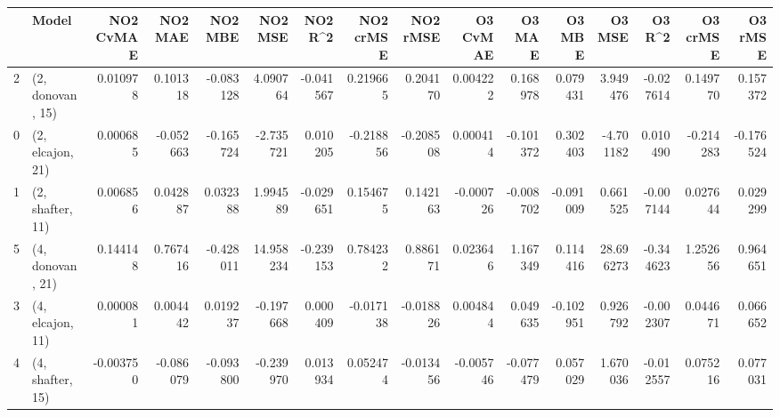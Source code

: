 \begin{tabular}{llrrrrrrrrrrrrrr}
\toprule
{} &             Model &  NO2 CvMAE &   NO2 MAE &   NO2 MBE &    NO2 MSE &   NO2 R\textasciicircum2 &  NO2 crMSE &  NO2 rMSE &  O3 CvMAE &    O3 MAE &    O3 MBE &     O3 MSE &    O3 R\textasciicircum2 &  O3 crMSE &   O3 rMSE \\
\midrule
2 &  (2, donovan, 15) &   0.010978 &  0.101318 & -0.083128 &   4.090764 & -0.041567 &   0.219665 &  0.204170 &  0.004222 &  0.168978 &  0.079431 &   3.949476 & -0.027614 &  0.149770 &  0.157372 \\
0 &  (2, elcajon, 21) &   0.000685 & -0.052663 & -0.165724 &  -2.735721 &  0.010205 &  -0.218856 & -0.208508 &  0.000414 & -0.101372 &  0.302403 &  -4.701182 &  0.010490 & -0.214283 & -0.176524 \\
1 &  (2, shafter, 11) &   0.006856 &  0.042887 &  0.032388 &   1.994589 & -0.029651 &   0.154675 &  0.142163 & -0.000726 & -0.008702 & -0.091009 &   0.661525 & -0.007144 &  0.027644 &  0.029299 \\
5 &  (4, donovan, 21) &   0.144148 &  0.767416 & -0.428011 &  14.958234 & -0.239153 &   0.784232 &  0.886171 &  0.023646 &  1.167349 &  0.114416 &  28.696273 & -0.344623 &  1.252656 &  0.964651 \\
3 &  (4, elcajon, 11) &   0.000081 &  0.004442 &  0.019237 &  -0.197668 &  0.000409 &  -0.017138 & -0.018826 &  0.004844 &  0.049635 & -0.102951 &   0.926792 & -0.002307 &  0.044671 &  0.066652 \\
4 &  (4, shafter, 15) &  -0.003750 & -0.086079 & -0.093800 &  -0.239970 &  0.013934 &   0.052474 & -0.013456 & -0.005746 & -0.077479 &  0.057029 &   1.670036 & -0.012557 &  0.075216 &  0.077031 \\
\bottomrule
\end{tabular}
